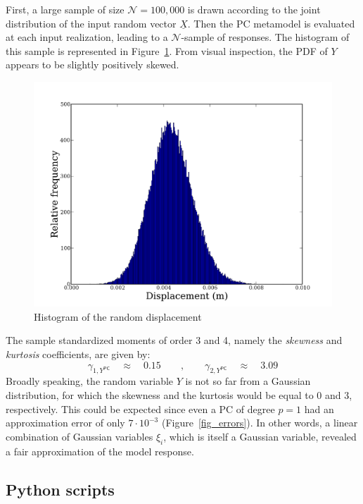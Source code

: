 \documentclass[11pt]{article}
\begin{document}
First, a large sample of size $\mathcal{N} = 100,000$ is drawn according to the joint distribution of the input random vector $\underline{X}$. Then the PC metamodel is evaluated at each input realization, leading to a $\mathcal{N}$-sample of responses. The histogram of this sample is represented in Figure~\ref{fig_histo}. From visual inspection, the PDF of $Y$ appears to be slightly positively skewed. \\

\begin{figure}[Hhbtp] 
  \begin{center}
    \includegraphics[width=12cm]{Truss_histo.png}
  \end{center} 
  \caption{Histogram of the random displacement}
\label{fig_histo}
\end{figure}

The sample standardized moments of order 3 and 4, namely the \emph{skewness} and \emph{kurtosis} coefficients, are given by:
\begin{equation}
 \gamma_{1,Y^\textsf{PC}} \quad \approx \quad 0.15 \qquad , \qquad \gamma_{2,Y^\textsf{PC}} \quad \approx \quad 3.09
\end{equation} 
Broadly speaking, the random variable $Y$ is not so far from a Gaussian distribution, for which the skewness and the kurtosis would be equal to 0 and 3, respectively. This could be expected since even a PC of degree $p=1$ had an approximation error of only $7 \cdot 10^{-3}$ (Figure~\ref{fig_errors}). In other words, a linear combination of Gaussian variables $\xi_i$, which is itself a Gaussian variable, revealed a fair approximation of the model response.

\subsection{Python scripts}
\end{document}

